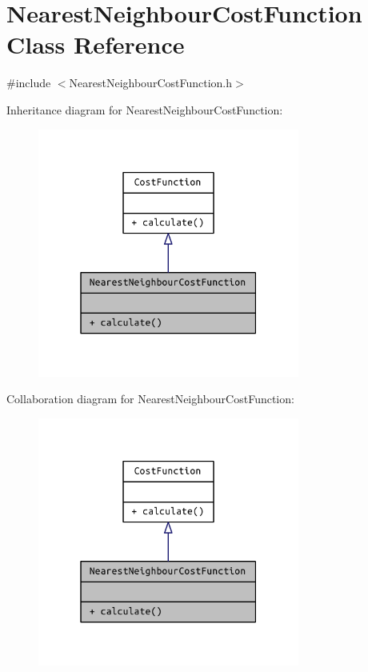 \hypertarget{class_nearest_neighbour_cost_function}{}\section{Nearest\+Neighbour\+Cost\+Function Class Reference}
\label{class_nearest_neighbour_cost_function}


{\ttfamily \#include $<$Nearest\+Neighbour\+Cost\+Function.\+h$>$}



Inheritance diagram for Nearest\+Neighbour\+Cost\+Function\+:
\nopagebreak
\begin{figure}[H]
\begin{center}
\leavevmode
\includegraphics[width=244pt]{class_nearest_neighbour_cost_function__inherit__graph}
\end{center}
\end{figure}


Collaboration diagram for Nearest\+Neighbour\+Cost\+Function\+:
\nopagebreak
\begin{figure}[H]
\begin{center}
\leavevmode
\includegraphics[width=244pt]{class_nearest_neighbour_cost_function__coll__graph}
\end{center}
\end{figure}
